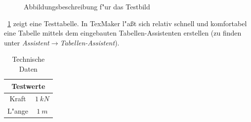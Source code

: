 \begin{figure}[H]
\centering
{}
\caption[Kurze Abbildungsbeschreibung f"ur das Abbildungsverzeichnis]{Abbildungsbeschreibung f"ur das Testbild\atlbe}
\label{fig:testbild}
\end{figure}


\tablename~\ref{tab:testtabelle} zeigt eine Testtabelle. In TexMaker l"a{\ss}t sich relativ schnell und komfortabel eine Tabelle mittels dem eingebauten Tabellen-Assistenten erstellen (zu finden unter \emph{Assistent}$\rightarrow$\emph{Tabellen-Assistent}).

\begin{table}[H]
\caption[Kurze Bennennung der Tabelle mit den technischen Daten f"ur das Tabellenverzeichnis]{Technische Daten\atlbe}
\centering
\begin{tabular}{cc}
\toprule
\multicolumn{2}{c}{\textbf{Testwerte}}\\
\midrule
Kraft & $\SI{1}{kN}$\\
L"ange & $\SI{1}{m}$\\
\bottomrule
\end{tabular}
\label{tab:testtabelle}
\end{table}

